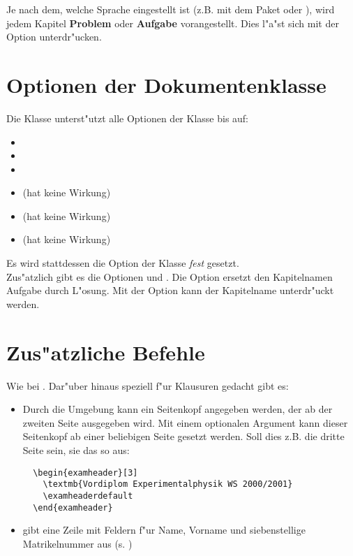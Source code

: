 \documentclass[twoside,colorback,accentcolor=tud4c,11pt]{tudreport}
\begin{document}
  Je nach dem, welche Sprache eingestellt ist (z.B. mit dem Paket  oder
  ), wird jedem Kapitel \textbf{Problem} oder \textbf{Aufgabe} vorangestellt.
  Dies l"a"st sich mit der Option  unterdr"ucken.

  \section{Optionen der Dokumentenklasse \texorpdfstring{}{tudexercise}}

  Die Klasse  unterst"utzt alle Optionen der
   Klasse bis auf:
  \begin{itemize}\itemsep-0.5ex
     \item {}
     \item {}
     \item {}
     \item {} (hat keine Wirkung)
     \item {} (hat keine Wirkung)
     \item {} (hat keine Wirkung)
  \end{itemize}
  Es wird stattdessen die Option  der Klasse
   \emph{fest} gesetzt.\\[0.5\baselineskip]
  Zus"atzlich gibt es die Optionen  und . Die Option 
  ersetzt den Kapitelnamen \glqq Aufgabe\grqq{} durch \glqq{} L"osung\grqq. Mit der Option  kann
  der Kapitelname unterdr"uckt werden.
        
  \section{Zus"atzliche Befehle}
    Wie bei . Dar"uber hinaus speziell f"ur Klausuren
    gedacht gibt es:
    \begin{itemize}\itemsep-0.5ex
     \item Durch die Umgebung  kann ein Seitenkopf angegeben werden, der ab
       der zweiten Seite ausgegeben wird. Mit einem optionalen Argument kann dieser 
       Seitenkopf ab einer beliebigen Seite gesetzt werden. Soll dies z.B. die dritte Seite sein,
       sie das so aus:
       \begin{verbatim}
  \begin{examheader}[3]
    \textmb{Vordiplom Experimentalphysik WS 2000/2001}
    \examheaderdefault
  \end{examheader}
       \end{verbatim}
     \item {} gibt eine Zeile mit Feldern f"ur Name,
     Vorname und siebenstellige Matrikelnummer aus (s. )
  \end{itemize}
    
\end{document}
